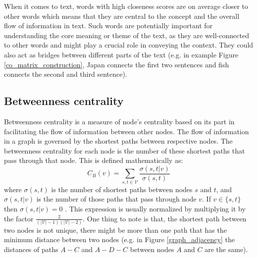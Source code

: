 \documentclass[12pt]{article}
\numberwithin{equation}{section}
\begin{document}
\begin{spacing}{1.5}
	When it comes to text, words with high closeness scores are on average closer to other words which means that they are central to the concept and the overall flow of information in text. Such words are potentially important for understanding the core meaning or theme of the text, as they are well-connected to other words and might play a crucial role in conveying the context. They could also act as bridges between different parts of the text (e.g. in example Figure \ref{co_matrix_construction}, Japan connects the first two sentences and fish connects the second and third sentence).
	
	\subsection{Betweenness centrality}
	Betweenness centrality is a measure of node's centrality based on its part in facilitating the flow of information between other nodes. The flow of information in a graph is governed by the shortest paths between respective nodes. The betweenness centrality for each node is the number of these shortest paths that pass through that node. This is defined mathematically as:
	\begin{equation}
		C_B(v) = \sum_{s,t \in \mathcal{V}} \frac{\sigma(s, t|v)}{\sigma(s,t)}
	\end{equation}
	where $\sigma(s,t)$ is the number of shortest paths between nodes $s$ and $t$, and $\sigma(s, t|v)$ is the number of those paths that pass through node $v$. If $v \in \{s, t\}$ then $\sigma(s, t|v) = 0$ \cite{freeman}. This expression is usually normalized by multiplying it by the factor $\frac{2}{(|\mathcal{V}| -1)(|\mathcal{V}| - 2)}$. One thing to note is that, the shortest path between two nodes is not unique, there might be more than one path that has the minimum distance between two nodes (e.g. in Figure \ref{graph_adjacency} the distances of paths $A - C$ and $A - D - C$ between nodes $A$ and $C$ are the same).
	

\end{spacing}
\end{document}
